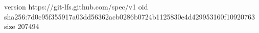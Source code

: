 version https://git-lfs.github.com/spec/v1
oid sha256:7d0c95f355917a03dd56362acb0286b0724b1125830e4d429953160f10920763
size 207494

